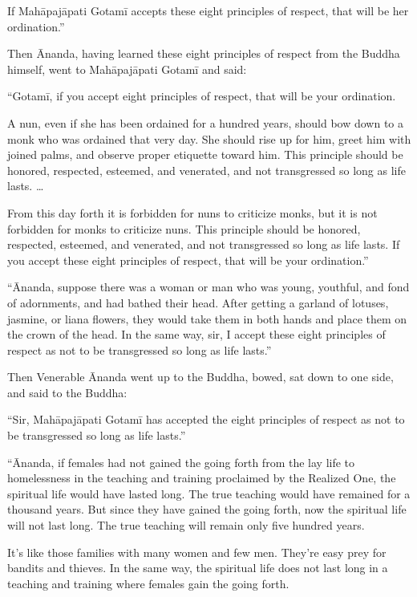 \documentclass[12pt,openany]{book}%
\begin{document}
If \textsanskrit{Mahāpajāpati} \textsanskrit{Gotamī} accepts these eight principles of respect, that will be her ordination.” 

Then Ānanda, having learned these eight principles of respect from the Buddha himself, went to \textsanskrit{Mahāpajāpati} \textsanskrit{Gotamī} and said: 

“\textsanskrit{Gotamī}, if you accept eight principles of respect, that will be your ordination. 

A nun, even if she has been ordained for a hundred years, should bow down to a monk who was ordained that very day. She should rise up for him, greet him with joined palms, and observe proper etiquette toward him. This principle should be honored, respected, esteemed, and venerated, and not transgressed so long as life lasts. … 

From this day forth it is forbidden for nuns to criticize monks, but it is not forbidden for monks to criticize nuns. This principle should be honored, respected, esteemed, and venerated, and not transgressed so long as life lasts. If you accept these eight principles of respect, that will be your ordination.” 

“Ānanda, suppose there was a woman or man who was young, youthful, and fond of adornments, and had bathed their head. After getting a garland of lotuses, jasmine, or liana flowers, they would take them in both hands and place them on the crown of the head. In the same way, sir, I accept these eight principles of respect as not to be transgressed so long as life lasts.” 

Then Venerable Ānanda went up to the Buddha, bowed, sat down to one side, and said to the Buddha: 

“Sir, \textsanskrit{Mahāpajāpati} \textsanskrit{Gotamī} has accepted the eight principles of respect as not to be transgressed so long as life lasts.” 

“Ānanda, if females had not gained the going forth from the lay life to homelessness in the teaching and training proclaimed by the Realized One, the spiritual life would have lasted long. The true teaching would have remained for a thousand years. But since they have gained the going forth, now the spiritual life will not last long. The true teaching will remain only five hundred years. 

It’s like those families with many women and few men. They’re easy prey for bandits and thieves. In the same way, the spiritual life does not last long in a teaching and training where females gain the going forth. 
\end{document}
